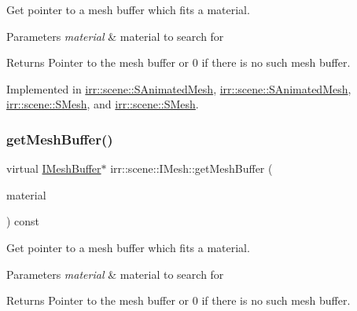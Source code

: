 Get pointer to a mesh buffer which fits a material. 


\begin{DoxyParams}{Parameters}
{\em material} & material to search for \\
\hline
\end{DoxyParams}
\begin{DoxyReturn}{Returns}
Pointer to the mesh buffer or 0 if there is no such mesh buffer. 
\end{DoxyReturn}


Implemented in \hyperlink{structirr_1_1scene_1_1SAnimatedMesh_a3c010c881f315e56a05f40632f3c7f79}{irr\+::scene\+::\+S\+Animated\+Mesh}, \hyperlink{structirr_1_1scene_1_1SAnimatedMesh_a3c010c881f315e56a05f40632f3c7f79}{irr\+::scene\+::\+S\+Animated\+Mesh}, \hyperlink{structirr_1_1scene_1_1SMesh_a768eeba9148e949d6962bee08517a056}{irr\+::scene\+::\+S\+Mesh}, and \hyperlink{structirr_1_1scene_1_1SMesh_a768eeba9148e949d6962bee08517a056}{irr\+::scene\+::\+S\+Mesh}.

\mbox{\label{classirr_1_1scene_1_1IMesh_a9573dace82efb01ba1f35f9cc28a4ced}} 
\subsubsection{\texorpdfstring{get\+Mesh\+Buffer()}{getMeshBuffer()}\hspace{0.1cm}{\footnotesize\ttfamily [4/4]}}
{\footnotesize\ttfamily virtual \hyperlink{classirr_1_1scene_1_1IMeshBuffer}{I\+Mesh\+Buffer}$\ast$ irr\+::scene\+::\+I\+Mesh\+::get\+Mesh\+Buffer (\begin{DoxyParamCaption}\item[{const \hyperlink{classirr_1_1video_1_1SMaterial}{video\+::\+S\+Material} \&}]{material }\end{DoxyParamCaption}) const\hspace{0.3cm}{\ttfamily [pure virtual]}}



Get pointer to a mesh buffer which fits a material. 


\begin{DoxyParams}{Parameters}
{\em material} & material to search for \\
\hline
\end{DoxyParams}
\begin{DoxyReturn}{Returns}
Pointer to the mesh buffer or 0 if there is no such mesh buffer. 
\end{DoxyReturn}


